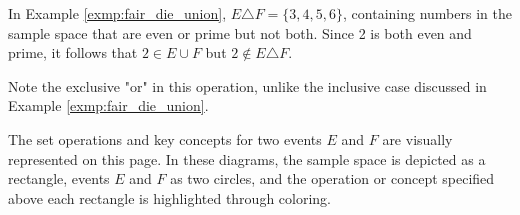 \begin{exmp}
	In Example \autoref{exmp:fair_die_union}, \( E \triangle F = \{ 3, 4, 5, 6 \} \),
	containing numbers in the sample space that are even or prime but not both.
	Since 2 is both even and prime, it follows that \( 2 \in E \cup F \) but \( 2 \not\in E \triangle F \).

	Note the exclusive "or" in this operation, unlike the inclusive case discussed in Example \autoref{exmp:fair_die_union}.
\end{exmp}

The set operations and key concepts for two events \( E \) and \( F \) are visually represented on this page.
In these diagrams, the sample space is depicted as a rectangle,
events \( E \) and \( F \) as two circles,
and the operation or concept specified above each rectangle is highlighted through coloring.

